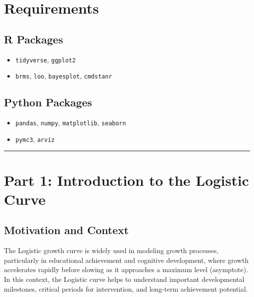 \documentclass[
  letterpaper,
  DIV=11,
  numbers=noendperiod]{scrreprt}
\providecommand{\tightlist}{%
  \setlength{\itemsep}{0pt}\setlength{\parskip}{0pt}}\usepackage{longtable,booktabs,array}
\begin{document}
\section{Requirements}\label{requirements-1}

\subsection{R Packages}\label{r-packages-1}

\begin{itemize}
\tightlist
\item
  \texttt{tidyverse}, \texttt{ggplot2}
\item
  \texttt{brms}, \texttt{loo}, \texttt{bayesplot}, \texttt{cmdstanr}
\end{itemize}

\subsection{Python Packages}\label{python-packages-1}

\begin{itemize}
\tightlist
\item
  \texttt{pandas}, \texttt{numpy}, \texttt{matplotlib}, \texttt{seaborn}
\item
  \texttt{pymc3}, \texttt{arviz}
\end{itemize}

\begin{center}\rule{0.5\linewidth}{0.5pt}\end{center}

\section{Part 1: Introduction to the Logistic
Curve}\label{part-1-introduction-to-the-logistic-curve}

\subsection{Motivation and Context}\label{motivation-and-context}

The Logistic growth curve is widely used in modeling growth processes,
particularly in educational achievement and cognitive development, where
growth accelerates rapidly before slowing as it approaches a maximum
level (asymptote). In this context, the Logistic curve helps to
understand important developmental milestones, critical periods for
intervention, and long-term achievement potential.
\end{document}
